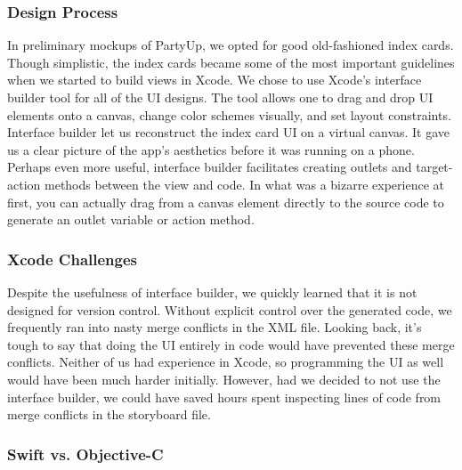 \documentclass[12pt]{article}
\begin{document}
\subsubsection{Design Process}


\begin{figure}[!htb]
	\centering
\end{figure}

In preliminary mockups of PartyUp, we opted for good old-fashioned index cards. Though simplistic, the index cards became some of the most important guidelines when we started to build views in Xcode.
We chose to use Xcode's interface builder tool for all of the UI designs. The tool allows one to drag and drop UI elements onto a canvas, change color schemes visually, and set layout constraints.
Interface builder let us reconstruct the index card UI on a virtual canvas. It gave us a clear picture of the app's aesthetics before it was running on a phone. 
Perhaps even more useful, interface builder facilitates creating outlets and target-action methods between the view and code. 
In what was a bizarre experience at first, you can actually drag from a canvas element directly to the source code to generate an outlet variable or action method. 

\subsubsection{Xcode Challenges}

Despite the usefulness of interface builder, we quickly learned that it is not designed for version control.
Without explicit control over the generated code, we frequently ran into nasty merge conflicts in the XML file.
Looking back, it's tough to say that doing the UI entirely in code would have prevented these merge conflicts. 
Neither of us had experience in Xcode, so programming the UI as well would have been much harder initially. 
However, had we decided to not use the interface builder, we could have saved hours spent inspecting lines of code from merge conflicts in the storyboard file. 

\subsubsection{Swift vs. Objective-C}
\end{document}
